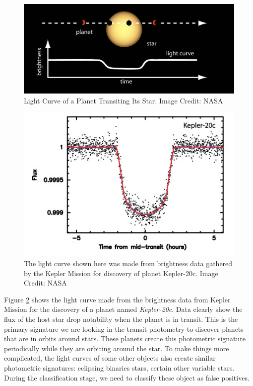 \begin{figure}[!h]
\begin{center}
        \includegraphics[width=0.7\textheight]{img/lightcurve.jpg}
        \caption{Light Curve of a Planet Transiting Its Star. Image Credit: NASA}  \label{fig:transit}
\end{center}
\end{figure}

\begin{figure}[!h]
\begin{center}
        \includegraphics[width=0.6\textheight]{img/k20c.jpg}
        \caption{The light curve shown here was made from brightness data gathered by the Kepler Mission for discovery of planet Kepler-20c.
Image Credit: NASA}  \label{fig:lightcurve}
\end{center}
\end{figure}

Figure \ref{fig:lightcurve} shows the light curve made from the brightness data from Kepler Mission for the discovery of a planet named \emph{Kepler-20c}. Data clearly show the flux of the host star drop notability when the planet is in transit. This is the primary signature we are looking in the transit photometry to discover planets that are in orbits around stars. These planets create this photometric signature periodically while they are orbiting around the star. To make things more complicated, the light curves of some other objects also create similar photometric signatures: eclipsing binaries stars, certain other variable stars. During the classification stage, we need to classify these object as false positives. 


